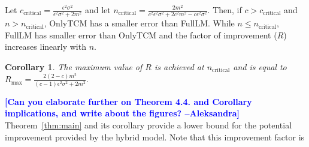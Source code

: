 \documentclass{article}
\newcommand{\ak}[1]{\textcolor{blue}{\bf\small [#1 --Aleksandra]}}
\theoremstyle{plain}
\newtheorem*{cor}{Corollary}
\begin{document}
Let $c_{\text{critical}} = \frac{\epsilon^2 \sigma^2}{\epsilon^2 \sigma^2+2 m^2}$ and let $n_{\text{critical}} = \frac{2 m^2}{c^2 \epsilon^2 \sigma^2+2 c^2 m^2-c \epsilon^2 \sigma^2}.$ Then, if $c>c_{\text{critical}}$ and $n > n_{\text{critical}}$, OnlyTCM has a smaller error than FullLM. While $n \leq n_{\text{critical}}$, FullLM has smaller error than OnlyTCM and the factor of improvement ($R$) increases linearly with $n$. 

\begin{cor}
The maximum value of $R$ is achieved at $n_{\text{critical}}$ and is equal to $R_{\text{max}} = \frac{2 (2-c) m^2}{(c-1) \epsilon^2 \sigma^2+2 m^2}.$
\end{cor}

\ak{Can you elaborate further on Theorem 4.4. and Corollary implications, and write about the figures?}
Theorem~\ref{thm:main} and its corollary provide a lower bound for the potential improvement provided by the hybrid model. Note that this improvement factor is 
\end{document}
